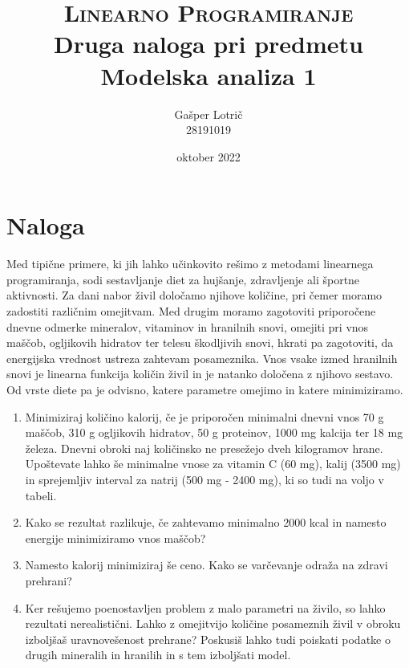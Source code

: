 \documentclass[a4paper, 12pt, slovene]{article}
\numberwithin{equation}{section}
\begin{document}
\begin{titlepage}
\title{\textsc{Linearno Programiranje} \\[1ex] \large Druga naloga pri predmetu Modelska analiza 1}
\author{Gašper Lotrič \\ 28191019}
\date{oktober 2022}

\maketitle
\end{titlepage}

\tableofcontents
\pagebreak


\section{Naloga}
Med tipične primere, ki jih lahko učinkovito rešimo z metodami linearnega programiranja, sodi sestavljanje diet za hujšanje, zdravljenje ali športne aktivnosti. Za dani nabor živil določamo njihove količine, pri čemer moramo zadostiti različnim omejitvam. Med drugim moramo zagotoviti priporočene dnevne odmerke mineralov, vitaminov in hranilnih snovi, omejiti pri vnos maščob, ogljikovih hidratov ter telesu škodljivih snovi, hkrati pa zagotoviti, da energijska vrednost ustreza zahtevam posameznika. Vnos vsake izmed hranilnih snovi je linearna funkcija količin živil in je natanko določena z njihovo
sestavo. Od vrste diete pa je odvisno, katere parametre omejimo in katere minimiziramo.
\begin{enumerate}
\item Minimiziraj količino kalorij, če je priporočen minimalni dnevni vnos 70 g maščob, 310 g ogljikovih hidratov, 50 g proteinov, 1000 mg kalcija ter 18 mg železa. Dnevni obroki naj količinsko ne presežejo dveh kilogramov hrane. Upoštevate lahko še minimalne vnose za vitamin C (60 mg), kalij (3500 mg) in sprejemljiv interval za natrij (500 mg - 2400 mg), ki so tudi na voljo v tabeli.
\item Kako se rezultat razlikuje, če zahtevamo minimalno 2000 kcal in namesto energije minimiziramo vnos maščob?
\item Namesto kalorij minimiziraj še ceno. Kako se varčevanje odraža na zdravi prehrani?
\item Ker rešujemo poenostavljen problem z malo parametri na živilo, so lahko rezultati nerealistični. Lahko z omejitvijo količine posameznih živil v obroku izboljšaš uravnovešenost prehrane? Poskusiš lahko tudi poiskati podatke o drugih mineralih in hranilih in s tem izboljšati model.
\end{enumerate}
\end{document}
